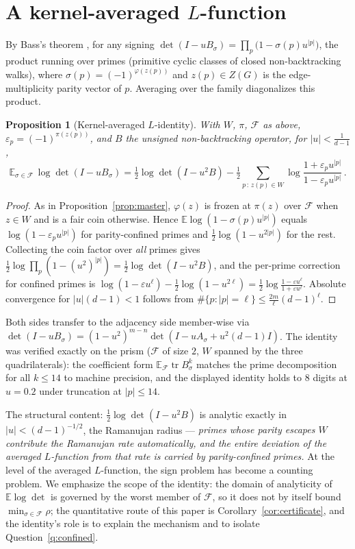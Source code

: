 \documentclass[11pt]{article}
\newtheorem{proposition}[lemma]{Proposition}
\theoremstyle{remark}
\DeclareMathOperator{\tr}{tr}
\begin{document}
\section{A kernel-averaged $L$-function}\label{sec:zeta}

By Bass's theorem \cite{bass92}, for any signing
$\det(I-uB_\sigma)=\prod_{p}\big(1-\sigma(p)u^{|p|}\big)$, the product
running over primes (primitive cyclic classes of closed non-backtracking
walks), where $\sigma(p)=(-1)^{\varphi(z(p))}$ and $z(p)\in Z(G)$ is the
edge-multiplicity parity vector of $p$. Averaging over the family
diagonalizes this product.

\begin{proposition}[Kernel-averaged $L$-identity]\label{prop:Lident}
With $W$, $\pi$, $\mathcal F$ as above, $\varepsilon_p=(-1)^{\pi(z(p))}$,
and $B$ the \emph{unsigned} non-backtracking operator, for
$|u|<\tfrac1{d-1}$,
\[
\mathbb E_{\sigma\in\mathcal F}\,\log\det(I-uB_\sigma)
=\tfrac12\log\det(I-u^2B)
-\tfrac12\!\!\sum_{p\,:\,z(p)\in W}\!\!
\log\frac{1+\varepsilon_pu^{|p|}}{1-\varepsilon_pu^{|p|}}\,.
\]
\end{proposition}

\begin{proof}
As in Proposition~\ref{prop:master}, $\varphi(z)$ is frozen at $\pi(z)$
over $\mathcal F$ when $z\in W$ and is a fair coin otherwise. Hence
$\mathbb E\log(1-\sigma(p)u^{|p|})$ equals
$\log(1-\varepsilon_pu^{|p|})$ for parity-confined primes and
$\tfrac12\log(1-u^{2|p|})$ for the rest. Collecting the coin factor over
\emph{all} primes gives
$\tfrac12\log\prod_p(1-(u^2)^{|p|})=\tfrac12\log\det(I-u^2B)$, and the
per-prime correction for confined primes is
$\log(1-\varepsilon u^{\ell})-\tfrac12\log(1-u^{2\ell})
=\tfrac12\log\frac{1-\varepsilon u^{\ell}}{1+\varepsilon u^{\ell}}$.
Absolute convergence for $|u|(d-1)<1$ follows from
$\#\{p:|p|=\ell\}\le\tfrac{2m}{\ell}(d-1)^{\ell}$.
\end{proof}

Both sides transfer to the adjacency side member-wise via
$\det(I-uB_\sigma)=(1-u^2)^{m-n}\det(I-uA_\sigma+u^2(d-1)I)$. The
identity was verified exactly on the prism ($\mathcal F$ of size $2$,
$W$ spanned by the three quadrilaterals): the coefficient form
$\mathbb E_{\mathcal F}\tr B_\sigma^k$ matches the prime decomposition
for all $k\le14$ to machine precision, and the displayed identity holds
to $8$ digits at $u=0.2$ under truncation at $|p|\le14$.

The structural content: $\tfrac12\log\det(I-u^2B)$ is analytic exactly
in $|u|<(d-1)^{-1/2}$, the Ramanujan radius --- \emph{primes whose
parity escapes $W$ contribute the Ramanujan rate automatically, and the
entire deviation of the averaged $L$-function from that rate is carried
by parity-confined primes.} At the level of the averaged $L$-function, the sign problem has
become a counting problem. We emphasize the scope of the identity: the
domain of analyticity of $\mathbb E\log\det$ is governed by the worst
member of $\mathcal F$, so it does not by itself bound
$\min_{\sigma\in\mathcal F}\rho$; the quantitative route of this
paper is Corollary~\ref{cor:certificate}, and the identity's role is
to explain the mechanism and to isolate Question~\ref{q:confined}.
\end{document}
